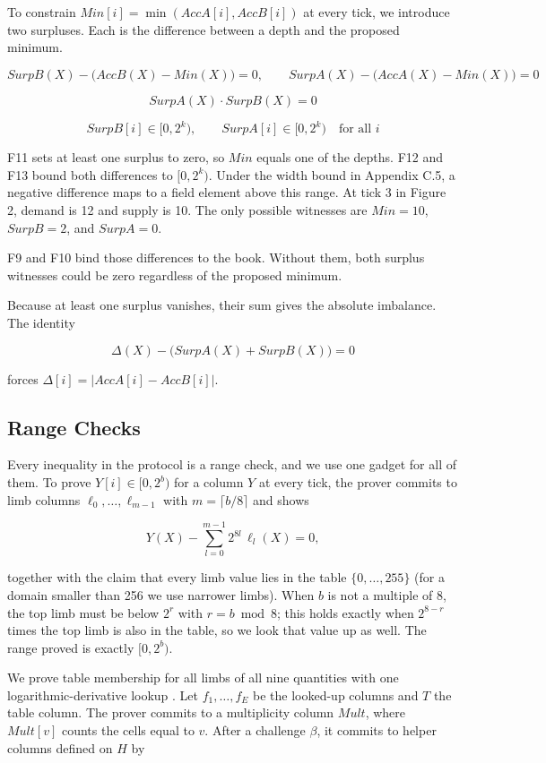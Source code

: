 To constrain \(Min[i]=\min(AccA[i],AccB[i])\) at every tick, we introduce two surpluses. Each is the difference between a depth and the proposed minimum.

\[SurpB(X) - \big(AccB(X) - Min(X)\big) = 0, \qquad SurpA(X) - \big(AccA(X) - Min(X)\big) = 0 \tag{F9, F10}\]

\[SurpA(X) \cdot SurpB(X) = 0 \tag{F11}\]

\[SurpB[i] \in [0, 2^k), \qquad SurpA[i] \in [0, 2^k) \quad \text{for all } i \tag{F12, F13}\]

F11 sets at least one surplus to zero, so \(Min\) equals one of the depths. F12 and F13 bound both differences to \([0,2^k)\). Under the width bound in Appendix C.5, a negative difference maps to a field element above this range. At tick 3 in Figure 2, demand is 12 and supply is 10. The only possible witnesses are \(Min=10\), \(SurpB=2\), and \(SurpA=0\).

F9 and F10 bind those differences to the book. Without them, both surplus witnesses could be zero regardless of the proposed minimum.

Because at least one surplus vanishes, their sum gives the absolute imbalance. The identity

\[\Delta(X) - \big(SurpA(X) + SurpB(X)\big) = 0 \tag{F18}\]

forces \(\Delta[i] = \lvert AccA[i] - AccB[i] \rvert\).

\subsection{Range Checks}

Every inequality in the protocol is a range check, and we use one gadget for all of them. To prove \(Y[i] \in [0, 2^b)\) for a column \(Y\) at every tick, the prover commits to limb columns \(\ell_0, \ldots, \ell_{m-1}\) with \(m = \lceil b/8 \rceil\) and shows

\[Y(X) - \sum_{l=0}^{m-1} 2^{8l}\, \ell_l(X) = 0,\]

together with the claim that every limb value lies in the table \(\{0, \ldots, 255\}\) (for a domain smaller than 256 we use narrower limbs). When \(b\) is not a multiple of 8, the top limb must be below \(2^r\) with \(r = b \bmod 8\); this holds exactly when \(2^{8-r}\) times the top limb is also in the table, so we look that value up as well. The range proved is exactly \([0, 2^b)\).

We prove table membership for all limbs of all nine quantities with one logarithmic-derivative lookup \cite{habock2022}. Let \(f_1, \ldots, f_E\) be the looked-up columns and \(T\) the table column. The prover commits to a multiplicity column \(Mult\), where \(Mult[v]\) counts the cells equal to \(v\). After a challenge \(\beta\), it commits to helper columns defined on \(H\) by

